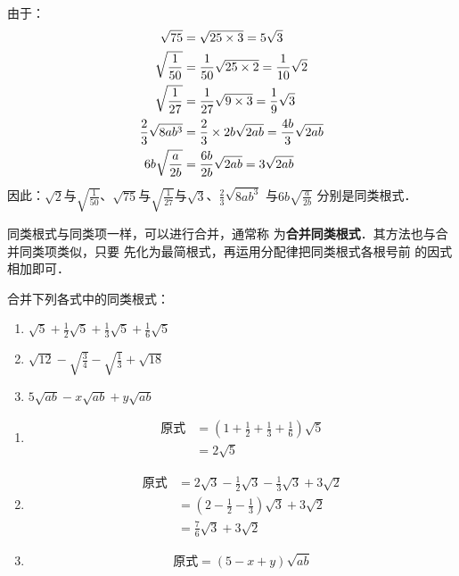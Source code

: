 \begin{solution}
由于：
\[\begin{split}
    \sqrt{75}&=\sqrt{25\times 3}=5\sqrt{3}\\
    \sqrt{\dfrac{1}{50}}&=\dfrac{1}{50}\sqrt{25\times 2}=\dfrac{1}{10}\sqrt{2}    \\
    \sqrt{\dfrac{1}{27}}&=\dfrac{1}{27}\sqrt{9\times 3}=\dfrac{1}{9}\sqrt{3}    \\
    \dfrac{2}{3}\sqrt{8ab^3}&=\dfrac{2}{3}\times 2b\sqrt{2ab}=\dfrac{4b}{3}\sqrt{2ab}    \\
    6b\sqrt{\dfrac{a}{2b}}&=\dfrac{6b}{2b}\sqrt{2ab}=3\sqrt{2ab}    \\
\end{split}\]
因此：$\sqrt{2}$与$\sqrt{\frac{1}{50}}$、$\sqrt{75}$与$\sqrt{\frac{1}{27}}$与$\sqrt{3}$、$\frac{2}{3}\sqrt{8ab^3}$
与$6b\sqrt{\frac{a}{2b}}$ 分别是同类根式． 
\end{solution}

同类根式与同类项一样，可以进行合并，通常称
为\textbf{合并同类根式}．其方法也与合并同类项类似，只要
先化为最简根式，再运用分配律把同类根式各根号前
的因式相加即可．

\begin{example}
    合并下列各式中的同类根式：
\begin{enumerate}
    \item $\sqrt{5}+\frac{1}{2}\sqrt{5}+\frac{1}{3}\sqrt{5}+\frac{1}{6}\sqrt{5}$
    \item $\sqrt{12}-\sqrt{\frac{3}{4}}-\sqrt{\frac{1}{3}}+\sqrt{18}$
    \item $5\sqrt{ab}-x\sqrt{ab}+y\sqrt{ab}$
\end{enumerate}
\end{example}

\begin{solution}
\begin{enumerate}
    \item \[\begin{split}
        \text{原式}&=\left(1+\frac{1}{2}+\frac{1}{3}+\frac{1}{6}\right)\sqrt{5}\\
        &=2\sqrt{5}
    \end{split}\]
    \item \[\begin{split}
        \text{原式}&=2\sqrt{3}-\frac{1}{2}\sqrt{3}-\frac{1}{3}\sqrt{3}+3\sqrt{2}\\
        &=\left(2-\frac{1}{2}-\frac{1}{3}\right)\sqrt{3}+3\sqrt{2}\\
        &=\frac{7}{6}\sqrt{3}+3\sqrt{2}
    \end{split}\]
    \item  \[\text{原式}=(5-x+y)\sqrt{ab}\]
\end{enumerate}
\end{solution}

